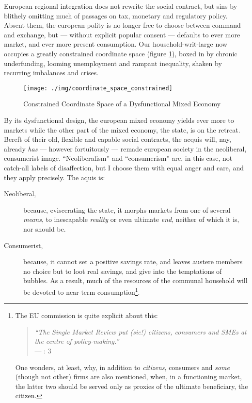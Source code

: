 \documentclass[11pt,a4paper,oneside,openright]{article}
\begin{document}
European regional integration does not rewrite the social contract, but sins by blithely omitting much of passages on tax, monetary and regulatory policy. Absent them, the european polity is no longer free to choose between %
command and exchange, but --- without explicit popular consent --- defaults to ever more market, and ever more present consumption. Our household-writ-large now occupies a greatly constrained coordinate space (figure \ref{fig:coordinate_space_constrained}), boxed in by chronic underfunding,  looming unemployment and rampant inequality, shaken by recurring imbalances and crises. 

\begin{figure}[htbp]
	\begin{center}
	\texttt{[image: ./img/coordinate\_space\_constrained]}  
	\caption{Constrained Coordinate Space of a Dysfunctional Mixed Economy}
	\label{fig:coordinate_space_constrained}
	\end{center}
\end{figure}

By its dysfunctional design, the european mixed economy yields ever more to markets while the other part of the mixed economy, the state, is on the retreat. Bereft of their old, flexible and capable social contracts, the acquis will, nay, already \emph{has} --- however fortuitously --- remade european society in the neoliberal, consumerist image. ``Neoliberalism'' and ``consumerism'' are, in this case, not catch-all labels of disaffection, but I choose them with equal anger and care, and they apply precisely. The aquis is:
\begin{description}
	\item[Neoliberal,] because, eviscerating the state, it morphs markets from one of several \emph{means}, to inescapable \emph{reality} or even ultimate \emph{end}, neither of which it is, nor should be.
	\item[Consumerist,] because, it cannot set a positive savings rate, and leaves austere members no choice but to loot real savings, and give into the temptations of bubbles. As a result, much of the resources of the communal household will be devoted to near-term consumption\footnote{
		The \gls{EU} commission is quite explicit about this:
			\begin{quote}
				\emph{``The Single Market Review put \emph{(sic!)} citizens, consumers and \glspl{SME} at the centre of policy-making.''}\\
				--- \citealt{Commission2008}: 3	 
			\end{quote} 
		One wonders, at least, why, in addition to \emph{citizens}, consumers and \emph{some} (though not other) firms are also mentioned, when, in a functioning market, the latter two should be served only as proxies of the ultimate beneficiary, the citizen.}.
	
\end{description}
\end{document}
